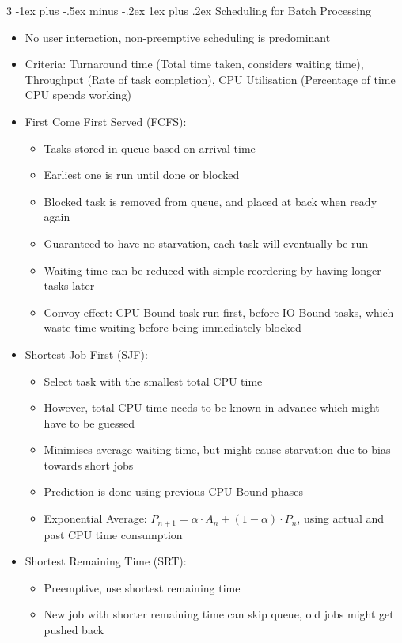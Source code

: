\documentclass[10pt, landscape]{article}
\makeatletter
\renewcommand{\subsection}{\@startsection{subsection}{3}{0mm}%
                                {-1ex plus -.5ex minus -.2ex}%
                                {1ex plus .2ex}%
                                {\normalfont\small\bfseries}}%
\makeatother
\begin{document}
\begin{multicols*}{3}
\subsection{Scheduling for Batch Processing}
\begin{itemize}
    \item No user interaction, non-preemptive scheduling is predominant
    \item Criteria: Turnaround time (Total time taken, considers waiting time), Throughput (Rate of task completion), CPU Utilisation (Percentage of time CPU spends working)
    \item First Come First Served (FCFS):
    \begin{itemize}
        \item Tasks stored in queue based on arrival time
        \item Earliest one is run until done or blocked
        \item Blocked task is removed from queue, and placed at back when ready again
        \item Guaranteed to have no starvation, each task will eventually be run
        \item Waiting time can be reduced with simple reordering by having longer tasks later
        \item Convoy effect: CPU-Bound task run first, before IO-Bound tasks, which waste time waiting before being immediately blocked
    \end{itemize}
    \item Shortest Job First (SJF):
    \begin{itemize}
        \item Select task with the smallest total CPU time
        \item However, total CPU time needs to be known in advance which might have to be guessed
        \item Minimises average waiting time, but might cause starvation due to bias towards short jobs
        \item Prediction is done using previous CPU-Bound phases
        \item Exponential Average: $P_{n+1}=\alpha \cdot A_n+(1-\alpha)\cdot P_n$, using actual and past CPU time consumption
    \end{itemize}
    \item Shortest Remaining Time (SRT):
    \begin{itemize}
        \item Preemptive, use shortest remaining time
        \item New job with shorter remaining time can skip queue, old jobs might get pushed back
    \end{itemize}
\end{itemize}


\end{multicols*}
\end{document}
